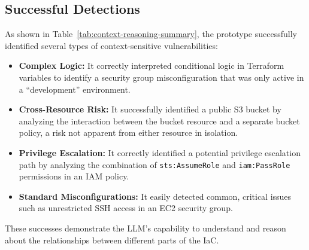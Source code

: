\subsection{Successful Detections}
As shown in Table~\ref{tab:context-reasoning-summary}, the prototype successfully identified several types of context-sensitive vulnerabilities:
\begin{itemize}
    \item \textbf{Complex Logic:} It correctly interpreted conditional logic in Terraform variables to identify a security group misconfiguration that was only active in a ``development'' environment.
    \item \textbf{Cross-Resource Risk:} It successfully identified a public S3 bucket by analyzing the interaction between the bucket resource and a separate bucket policy, a risk not apparent from either resource in isolation.
    \item \textbf{Privilege Escalation:} It correctly identified a potential privilege escalation path by analyzing the combination of \texttt{sts:AssumeRole} and \texttt{iam:PassRole} permissions in an IAM policy.
    \item \textbf{Standard Misconfigurations:} It easily detected common, critical issues such as unrestricted SSH access in an EC2 security group.
\end{itemize}
These successes demonstrate the LLM's capability to understand and reason about the relationships between different parts of the IaC.

